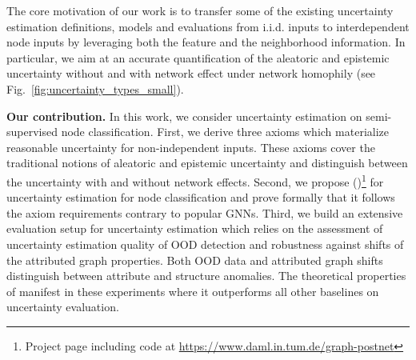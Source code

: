 The core motivation of our work is to transfer some of the existing uncertainty estimation definitions, models and evaluations from i.i.d. inputs to interdependent node inputs by leveraging both the feature and the neighborhood information. In particular, we aim at an accurate quantification of the aleatoric and epistemic uncertainty without and with network effect under network homophily (see Fig.~\ref{fig:uncertainty_types_small}).

\textbf{Our contribution.} In this work, we consider uncertainty estimation on semi-supervised node classification. First, we derive three axioms which materialize reasonable uncertainty for non-independent inputs. These axioms cover the traditional notions of aleatoric and epistemic uncertainty and distinguish between the uncertainty with and without network effects. Second, we propose \ours{} (\oursacro{})\footnote{Project page including code at \url{https://www.daml.in.tum.de/graph-postnet}} for uncertainty estimation for node classification and prove formally that it follows the axiom requirements contrary to popular GNNs. Third, we build an extensive evaluation setup for uncertainty estimation which relies on the assessment of uncertainty estimation quality of OOD detection and robustness against shifts of the attributed graph properties. Both OOD data and attributed graph shifts distinguish between attribute and structure anomalies. The theoretical properties of \oursacro{} manifest in these experiments where it outperforms all other baselines on uncertainty evaluation.

